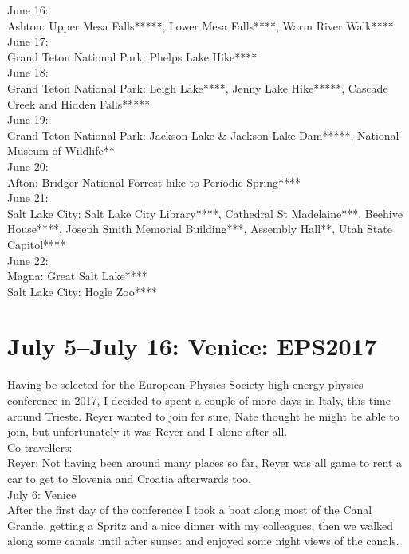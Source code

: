 June 16:\\
Ashton: Upper Mesa Falls*****, Lower Mesa Falls****, Warm River Walk****\\

June 17:\\
Grand Teton National Park: Phelps Lake Hike****\\

June 18:\\
Grand Teton National Park: Leigh Lake****, Jenny Lake Hike*****, Cascade Creek and Hidden Falls*****\\

June 19:\\
Grand Teton National Park: Jackson Lake \& Jackson Lake Dam*****, National Museum of Wildlife**\\

June 20:\\
Afton: Bridger National Forrest hike to Periodic Spring****\\

June 21:\\
Salt Lake City: Salt Lake City Library****, Cathedral St Madelaine***, Beehive House****, Joseph Smith Memorial Building***, Assembly Hall**, Utah State Capitol****\\

June 22:\\
Magna: Great Salt Lake****\\
Salt Lake City: Hogle Zoo****

\section{July 5--July 16: Venice: EPS2017}
\label{Venice2017}

Having be selected for the European Physics Society high energy physics conference in 2017, I decided to spent a couple of more days in Italy, this time around Trieste. Reyer wanted to join for sure, Nate thought he might be able to join, but unfortunately it was Reyer and I alone after all.\\

Co-travellers:\\
Reyer: Not having been around many places so far, Reyer was all game to rent a car to get to Slovenia and Croatia afterwards too.\\

July 6: Venice\\
After the first day of the conference I took a boat along most of the Canal Grande, getting a Spritz and a nice dinner with my colleagues, then we walked along some canals until after sunset and enjoyed some night views of the canals.\\


